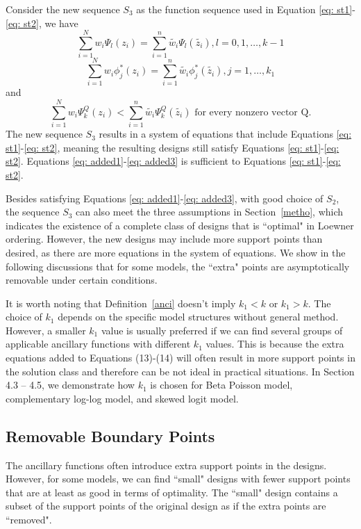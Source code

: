 \documentclass[12pt]{TD-CJS}
\begin{document}
Consider the new sequence $S_3$ as the function sequence used in Equation \eqref{eq: st1}-\eqref{eq: st2}, we have \begin{equation}\label{eq: added1}
\sum_{i=1}^Nw_i\Psi_l(z_i)=\sum_{i=1}^n\tilde{w_i}\Psi_l(\tilde{z_i}), l=0,1,\ldots, k-1    
\end{equation}
\begin{equation}\label{eq: added2}
\sum_{i=1}^Nw_i\phi_j^*(z_i)=\sum_{i=1}^n\tilde{w_i}\phi_j^*(\tilde{z_i}), j=1,\ldots, k_1    
\end{equation}and \begin{equation}\label{eq: added3}
\sum_{i=1}^Nw_i\Psi_k^Q(z_i)<\sum_{i=1}^n\tilde{w_i}\Psi_k^Q(\tilde{z_i}) \text{  for every nonzero vector Q}.
\end{equation}
The new sequence $S_3$ results in a system of equations that include Equations \eqref{eq: st1}-\eqref{eq: st2}, meaning the resulting designs still satisfy Equations \eqref{eq: st1}-\eqref{eq: st2}. Equations \eqref{eq: added1}-\eqref{eq: added3} is sufficient to Equations \eqref{eq: st1}-\eqref{eq: st2}.


Besides satisfying Equations \eqref{eq: added1}-\eqref{eq: added3}, with good choice of $S_2$, the sequence $S_3$ can also meet the three assumptions in Section~\ref{metho}, which indicates the existence of a complete class of designs that is ``optimal" in Loewner ordering. However, the new designs may include more support points than desired, as there are more equations in the system of equations. We show in the following discussions that for some models, the ``extra" points are asymptotically removable under certain conditions.


{\color{blue} It is worth noting that Definition~\ref{anci} doesn't imply $k_1<k$ or $k_1>k$. The choice of $k_1$ depends on the specific model structures without general method. However, a smaller $k_1$ value is usually preferred if we can find several groups of applicable ancillary functions with different $k_1$ values. This is because the extra equations added to Equations (13)-(14) will often result in more support points in the solution class and therefore can be not ideal in practical situations. In Section 4.3 – 4.5, we demonstrate how $k_1$ is chosen for Beta Poisson model, complementary log-log model, and skewed logit model.}

 
\subsection{Removable Boundary Points}
The ancillary functions often introduce extra support points in the designs. However, for some models, we can find ``small" designs with fewer support points that are at least as good in terms of optimality. The ``small" design contains a subset of the support points of the original design as if the extra points are ``removed". 
\end{document}
